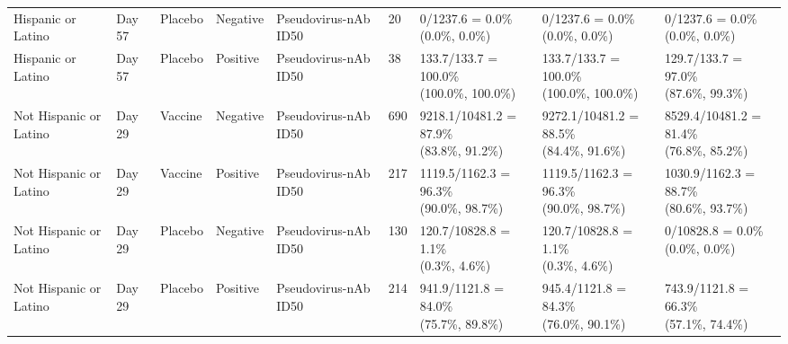 \documentclass[]{book}
\theoremstyle{definition}
\theoremstyle{definition}
\theoremstyle{definition}
\newcommand{\1}{\mathbbm{1}}
\begin{document}
\begin{landscape}
\begin{ThreePartTable}
\begin{longtable}[t]{>{\raggedright\arraybackslash}p{2.7cm}llllllll}
\hspace{1em}Hispanic or Latino & Day 57 & Placebo & Negative & Pseudovirus-nAb ID50 & 20 & \makecell[l]{0/1237.6 = 0.0\%\\(0.0\%, 0.0\%)} & \makecell[l]{0/1237.6 = 0.0\%\\(0.0\%, 0.0\%)} & \makecell[l]{0/1237.6 = 0.0\%\\(0.0\%, 0.0\%)}\\
\hspace{1em}Hispanic or Latino & Day 57 & Placebo & Positive & Pseudovirus-nAb ID50 & 38 & \makecell[l]{133.7/133.7 = 100.0\%\\(100.0\%, 100.0\%)} & \makecell[l]{133.7/133.7 = 100.0\%\\(100.0\%, 100.0\%)} & \makecell[l]{129.7/133.7 = 97.0\%\\(87.6\%, 99.3\%)}\\
\hspace{1em}Not Hispanic or Latino & Day 29 & Vaccine & Negative & Pseudovirus-nAb ID50 & 690 & \makecell[l]{9218.1/10481.2 = 87.9\%\\(83.8\%, 91.2\%)} & \makecell[l]{9272.1/10481.2 = 88.5\%\\(84.4\%, 91.6\%)} & \makecell[l]{8529.4/10481.2 = 81.4\%\\(76.8\%, 85.2\%)}\\
\hspace{1em}Not Hispanic or Latino & Day 29 & Vaccine & Positive & Pseudovirus-nAb ID50 & 217 & \makecell[l]{1119.5/1162.3 = 96.3\%\\(90.0\%, 98.7\%)} & \makecell[l]{1119.5/1162.3 = 96.3\%\\(90.0\%, 98.7\%)} & \makecell[l]{1030.9/1162.3 = 88.7\%\\(80.6\%, 93.7\%)}\\
\hspace{1em}Not Hispanic or Latino & Day 29 & Placebo & Negative & Pseudovirus-nAb ID50 & 130 & \makecell[l]{120.7/10828.8 = 1.1\%\\(0.3\%, 4.6\%)} & \makecell[l]{120.7/10828.8 = 1.1\%\\(0.3\%, 4.6\%)} & \makecell[l]{0/10828.8 = 0.0\%\\(0.0\%, 0.0\%)}\\
\hspace{1em}Not Hispanic or Latino & Day 29 & Placebo & Positive & Pseudovirus-nAb ID50 & 214 & \makecell[l]{941.9/1121.8 = 84.0\%\\(75.7\%, 89.8\%)} & \makecell[l]{945.4/1121.8 = 84.3\%\\(76.0\%, 90.1\%)} & \makecell[l]{743.9/1121.8 = 66.3\%\\(57.1\%, 74.4\%)}\\

\end{longtable}
\end{ThreePartTable}
\end{landscape}
\end{document}
